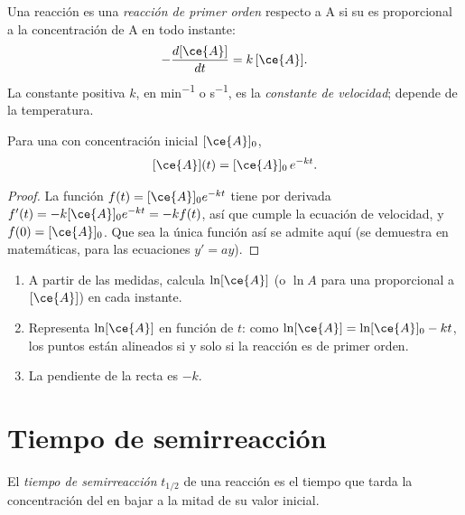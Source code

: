 \begin{definition}\label{def:g12:reaction-rates:first-order}
Una reacción es una \emph{reacción de primer orden}
respecto a A si su  es proporcional a la
concentración de A en todo instante:
\[
  -\frac{d[\ce{A}]}{dt} = k\,[\ce{A}] .
\]
La constante positiva $k$, en \si{min^{-1}} o \si{s^{-1}}, es la
\emph{constante de velocidad}; depende de la
temperatura.
\end{definition}

\begin{proposition}\label{prop:g12:reaction-rates:exponential}
Para una  con concentración inicial $[\ce{A}]_0$,
\[
  [\ce{A}](t) = [\ce{A}]_0\, e^{-kt} .
\]
\end{proposition}

\begin{proof}
La función $f(t) = [\ce{A}]_0 e^{-kt}$ tiene por derivada
$f'(t) = -k [\ce{A}]_0 e^{-kt} = -k f(t)$, así que cumple la ecuación de
velocidad, y $f(0) = [\ce{A}]_0$. Que sea la única función así se admite
aquí (se demuestra en matemáticas, para las ecuaciones $y' = ay$).
\end{proof}

\begin{method}\label{met:g12:reaction-rates:test}
\begin{enumerate}
  \item A partir de las medidas, calcula $\ln [\ce{A}]$ (o $\ln A$ para
        una  proporcional a $[\ce{A}]$) en cada instante.
  \item Representa $\ln[\ce{A}]$ en función de $t$: como
        $\ln[\ce{A}] = \ln[\ce{A}]_0 - kt$, los puntos están alineados si y
        solo si la reacción es de primer orden.
  \item La pendiente de la recta es $-k$.
\end{enumerate}
\end{method}

\section{Tiempo de semirreacción}

\begin{definition}\label{def:g12:reaction-rates:half-life}
El \emph{tiempo de semirreacción}
$t_{1/2}$ de una reacción es el tiempo que tarda la concentración del
 en bajar a la mitad de su valor inicial.
\end{definition}

